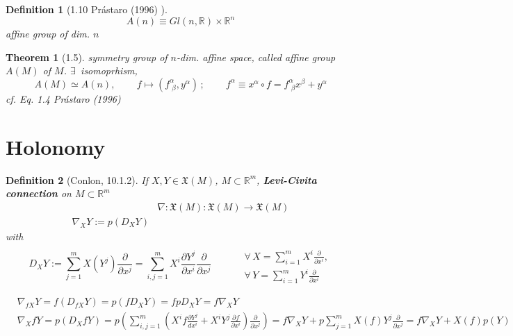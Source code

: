 \documentclass[10pt]{amsart}
\newtheorem{theorem}{Theorem}
\newtheorem{definition}{Definition}
\begin{document}
\begin{multicols*}{2}
\begin{definition}[1.10 Pr\'{a}staro (1996) \cite{Pras1996}]
  \begin{equation}
    A(n) \equiv Gl(n,\mathbb{R}) \times \mathbb{R}^n
  \end{equation}
  affine group of dim. $n$
  \end{definition}

\begin{theorem}[1.5] symmetry group of $n$-dim. affine space, called affine group $A(M)$ of $M$.  $\exists \, $ isomoprhism,
  \begin{equation}
    A(M) \simeq A(n), \qquad \, f\mapsto (f^{\alpha}_{ \, \, \beta} , y^{\alpha}) \, ; \qquad \, f^{\alpha} \equiv x^{\alpha} \circ f = f^{\alpha}_{ \, \, \beta} x^{\beta} + y^{\alpha}
  \end{equation}
cf. Eq. 1.4 Pr\'{a}staro (1996) \cite{Pras1996}
  \end{theorem}





\part{Holonomy}

\begin{definition}[Conlon, 10.1.2] If $X,Y\in \mathfrak{X}(M)$, $M\subset \mathbb{R}^m$, \textbf{Levi-Civita connection} on $M\subset \mathbb{R}^m$
	\begin{equation}
	\begin{aligned}
	& \nabla : \mathfrak{X}(M) : \mathfrak{X}(M) \to \mathfrak{X}(M) \\
	\nabla_XY := p(D_XY)
	\end{aligned}
	\end{equation}
	with 
	\[
	D_XY := \sum_{j=1}^m X(Y^j) \frac{ \partial }{ \partial x^j} = \sum_{i,j=1}^m X^i \frac{ \partial Y^j}{ \partial x^i} \frac{ \partial }{ \partial x^j} \qquad \,  \begin{aligned} & \quad \\ 
		& \forall \, X=\sum_{i=1}^m X^i \frac{ \partial }{ \partial x^i},  \\
		& \forall \, Y=\sum_{i=1}^m Y^i \frac{\partial }{ \partial x^i } \end{aligned}
	\]
\end{definition}

\[
\begin{aligned}
	& \nabla_{fX}Y = f(D_{fX}Y) = p(fD_XY) = fpD_XY = f\nabla_XY \\ 
	&  \nabla_X fY = p(D_XfY) = p \left( \sum_{i,j=1}^m \left( X^i f\frac{ \partial Y^j}{ dx^i } + X^i Y^j \frac{ \partial f}{ \partial x^i} \right) \frac{ \partial }{ \partial x^j} \right) = f\nabla_X Y + p \sum_{j=1}^m X(f) Y^j \frac{ \partial }{ \partial x^j} = f\nabla_XY + X(f) p(Y)
\end{aligned}
\]



\end{multicols*}
\end{document}
